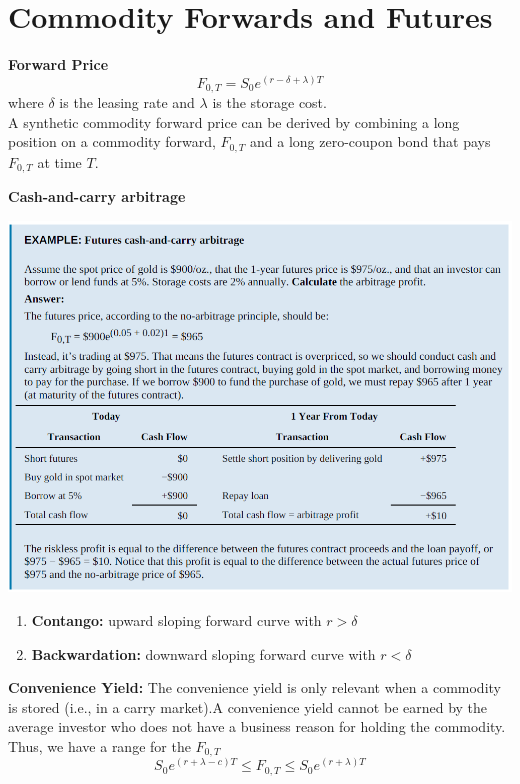\documentclass[11pt,fleqn]{report} %
\numberwithin{equation}{section} %
\numberwithin{figure}{section} %
\numberwithin{table}{section} %
\begin{document}
\chapter{Commodity Forwards and Futures}
 \begin{theorem}\textbf{Forward Price}
 $$
 F_{0,T}=S_0e^{(r-\delta+\lambda)T}
 $$
 where $\delta$ is the leasing rate and $\lambda$ is the storage cost.\\
 A synthetic commodity forward price can be derived by combining a long position on a commodity forward, $F_{0,T}$ and a long zero-coupon bond that pays $F_{0,T}$ at time $T$.
 \end{theorem}
 \begin{exercise}\textbf{Cash-and-carry arbitrage}
 \begin{center}
     \includegraphics[scale=0.42]{commfor.PNG}
 \end{center}
 \end{exercise}
  \begin{definition}
 \begin{enumerate}
     \item \textbf{Contango:} upward sloping forward curve with $r>\delta$
     \item \textbf{Backwardation:} downward sloping forward curve with $r<\delta$
 \end{enumerate}
 \end{definition}
 \begin{definition}\textbf{Convenience Yield:} The convenience yield is only relevant when a commodity is stored (i.e., in a carry market).A convenience yield cannot be earned by the average investor who does not have a business reason for holding the commodity. Thus, we have a range for the $F_{0,T}$
 $$
 S_{0}e^{(r+\lambda-c)T}\leq F_{0,T}\leq S_{0}e^{(r+\lambda)T}
 $$
 \end{definition}
\end{document}
